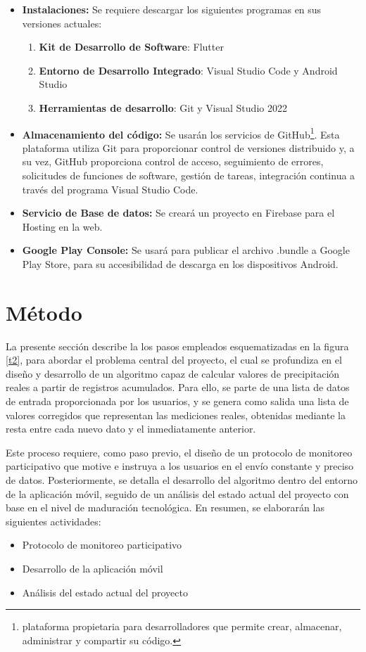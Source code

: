 \begin{itemize}
        \item \textbf{Instalaciones:} Se requiere descargar los siguientes programas en sus versiones actuales: \begin{enumerate}
        \item \textbf{Kit de Desarrollo de Software}: Flutter
        \item \textbf{Entorno de Desarrollo Integrado}: Visual Studio Code y Android Studio
        \item \textbf{Herramientas de desarrollo}: Git y Visual Studio 2022  
    \end{enumerate}
    \item \textbf{Almacenamiento del código:} Se usarán los servicios de GitHub\footnote{plataforma propietaria para desarrolladores que permite crear, almacenar, administrar y compartir su código.}. Esta plataforma utiliza Git para proporcionar control de versiones distribuido y, a su vez, GitHub proporciona control de acceso, seguimiento de errores, solicitudes de funciones de software, gestión de tareas, integración continua a través del programa Visual Studio Code.
    \item \textbf{Servicio de Base de datos:} Se creará un proyecto en Firebase para el Hosting en la web.
    \item \textbf{Google Play Console:} Se usará para publicar el archivo .bundle a Google Play Store, para su accesibilidad de descarga en los dispositivos Android.
\end{itemize}

\section{Método}
La presente sección describe la los pasos empleados esquematizadas en la figura \ref{t2}, para abordar el problema central del proyecto, el cual se profundiza en el diseño y desarrollo de un algoritmo capaz de calcular valores de precipitación reales a partir de registros acumulados. Para ello, se parte de una lista de datos de entrada proporcionada por los usuarios, y se genera como salida una lista de valores corregidos que representan las mediciones reales, obtenidas mediante la resta entre cada nuevo dato y el inmediatamente anterior.

Este proceso requiere, como paso previo, el diseño de un protocolo de monitoreo participativo que motive e instruya a los usuarios en el envío constante y preciso de datos. Posteriormente, se detalla el desarrollo del algoritmo dentro del entorno de la aplicación móvil, seguido de un análisis del estado actual del proyecto con base en el nivel de maduración tecnológica. En resumen, se elaborarán las siguientes actividades:
\begin{itemize}
  \item Protocolo de monitoreo participativo
  \item Desarrollo de la aplicación móvil
  \item Análisis del estado actual del proyecto
\end{itemize}






